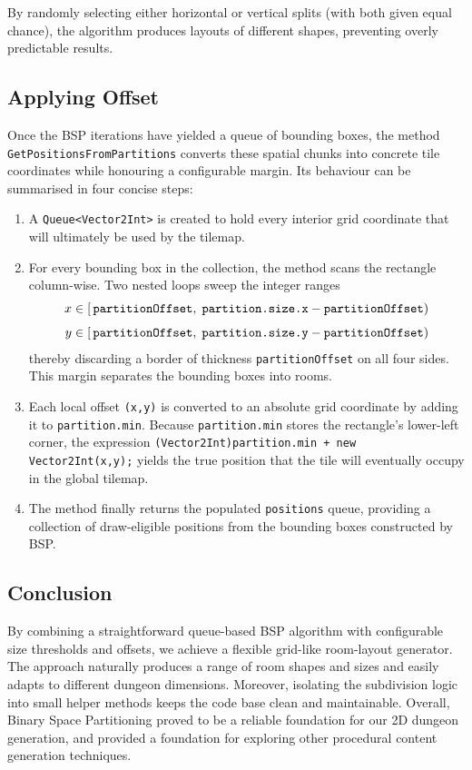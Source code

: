 \documentclass[a4paper, 12pt, one column, aas_macros]{article}
\begin{document}
By randomly selecting either horizontal or vertical splits (with both given equal chance), the algorithm produces layouts of different shapes, preventing overly predictable results.

\subsection{Applying Offset}
Once the BSP iterations have yielded a queue of bounding boxes, the method \\ \texttt{GetPositionsFromPartitions} converts these spatial chunks into concrete tile coordinates while honouring a configurable margin. Its behaviour can be summarised in four concise steps:
\begin{enumerate}
  \item A \texttt{Queue<Vector2Int>} is created to hold every interior grid coordinate that will ultimately be used by the tilemap.
  \item For every bounding box in the collection, the method scans the rectangle column-wise. Two nested loops sweep the integer ranges 
\[
\begin{aligned}
  x &\in [\,\text{\texttt{partitionOffset}},\;
           \text{\texttt{partition.size.x}}
           - \text{\texttt{partitionOffset}}) \\[4pt]
  y &\in [\,\text{\texttt{partitionOffset}},\;
           \text{\texttt{partition.size.y}}
           - \text{\texttt{partitionOffset}})
\end{aligned}
\]
thereby discarding a border of thickness \texttt{partitionOffset} on all four sides. This margin separates the bounding boxes into rooms.
  \item Each local offset \texttt{(x,y)} is converted to an absolute grid coordinate by adding it to \texttt{partition.min}. Because \texttt{partition.min} stores the rectangle's lower-left corner, the expression \texttt{(Vector2Int)partition.min + new Vector2Int(x,y);} yields the true position that the tile will eventually occupy in the global tilemap.
  \item The method finally returns the populated \texttt{positions} queue, providing a collection of draw-eligible positions from the bounding boxes constructed by BSP.
\end{enumerate}

\subsection{Conclusion}
By combining a straightforward queue-based BSP algorithm with configurable size thresholds and offsets, we achieve a flexible grid-like room-layout generator. The approach naturally produces a range of room shapes and sizes and easily adapts to different dungeon dimensions. Moreover, isolating the subdivision logic into small helper methods keeps the code base clean and maintainable. Overall, Binary Space Partitioning proved to be a reliable foundation for our 2D dungeon generation, and provided a foundation for exploring other procedural content generation techniques.
\end{document}

